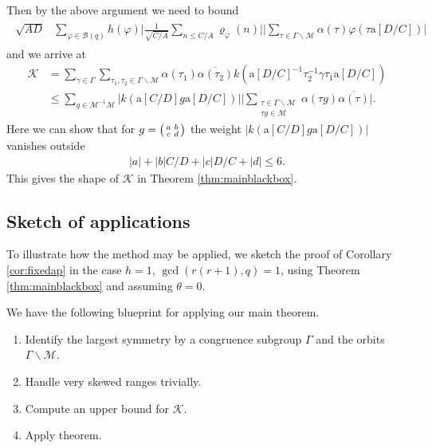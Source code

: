 \documentclass[12pt]{amsart}
\theoremstyle{definition}
\theoremstyle{remark}
\numberwithin{equation}{section}
\newcommand{\B}{\mathcal{B}}
\newcommand{\1}{{\mathbf 1}}
\renewcommand{\a}{\mathrm{a}}
\begin{document}
Then by the above argument we need to bound
\begin{align} \label{eq:comparetokuz,tauscalingmatrix}
\begin{split}
  \sqrt{AD} &\sum_{\varphi \in \B(q)} h(\varphi) \bigg|  \frac{1}{\sqrt{C/A}} \sum_{n \leq C/A} \varrho_{\varphi}(n) \bigg| \bigg| \sum_{\tau \in  \Gamma \backslash \mathcal{M} } \alpha(\tau )\varphi(\tau \a[D/C])   \bigg|   
\end{split}
\end{align}
and we arrive at
\begin{align*}
     \mathcal{K} &=  \sum_{\gamma \in \Gamma} \sum_{\tau_1,\tau_2 \in  \Gamma \backslash \mathcal{M} } \alpha(\tau_1 ) \overline{\alpha(\tau_2)}  k( \a[D/C]^{-1}\tau_2^{-1} \gamma \tau_1 \a[D/C]) \\
     & \leq   \sum_{g \in \mathcal{M}^{-1} \mathcal{M}}  |k( \a[C/D] g \a[D/C])| \bigg|\sum_{\substack{\tau \in \Gamma \backslash \mathcal{M} \\ \tau g \in \mathcal{M} }} \alpha(\tau g ) \overline{\alpha(\tau)} \bigg|.
\end{align*}
Here we can show that for $g= \smqty(a & b \\ c& d)$ the weight $|k( \a[C/D] g \a[D/C])|$ vanishes outside 
\begin{align*}
    |a|  + |b| C/D +|c| D/C + |d| \leq 6.
\end{align*}
This gives the shape of $\mathcal{K}$ in Theorem \ref{thm:mainblackbox}.

 

\subsection{Sketch of applications} \label{sec:applsketch}
To illustrate how the method may be applied, we sketch the proof of Corollary \ref{cor:fixedap} in the case $h=1$, $\gcd(r(r+1),q)=1$, using Theorem \ref{thm:mainblackbox} and assuming $\theta=0$. 

We have the following blueprint for applying our main theorem.
\begin{enumerate}
    \item Identify the largest symmetry by a congruence subgroup $\Gamma$ and the orbits $\Gamma \backslash \mathcal{M}$.
    \item Handle very skewed ranges trivially.
     \item Compute an upper bound for $\mathcal{K}$.
    \item Apply theorem.
\end{enumerate}
\end{document}
